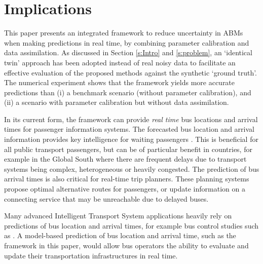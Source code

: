 \section{Implications\label{s:implications}}

This paper presents an integrated framework to reduce uncertainty in ABMs when making predictions in real time, by combining parameter calibration and data assimilation. As discussed in Section \ref{s:Intro} and \ref{s:problem}, an `identical twin' approach has been adopted instead of real noisy data to facilitate an effective evaluation of the proposed methods against the synthetic `ground truth'. The numerical experiment shows that the framework yields more accurate predictions than (i) a benchmark scenario (without parameter calibration), and (ii) a scenario with parameter calibration but without data assimilation. 

In its current form, the framework can provide \textit{real time} bus locations and arrival times for passenger information systems. The forecasted bus location and arrival information provides key intelligence for waiting passengers \cite{fan2016waiting}. This is beneficial for all public transport passengers, but can be of particular benefit in countries, for example in the Global South \cite{kumar2017bus} where  there are frequent delays due to transport systems being complex, heterogeneous or heavily congested. The prediction of bus arrival times is also critical for real-time trip planners. These planning systems propose optimal alternative routes for passengers, or update information on a connecting service that may be unreachable due to delayed buses. 

Many advanced Intelligent Transport System applications heavily rely on predictions of bus location and arrival times, for  example  bus control studies such as \cite{daganzo2009headway}.  A model-based prediction of bus location and arrival time, such as the framework in this paper, would allow bus operators the ability to evaluate and update their transportation infrastructures in real time.

